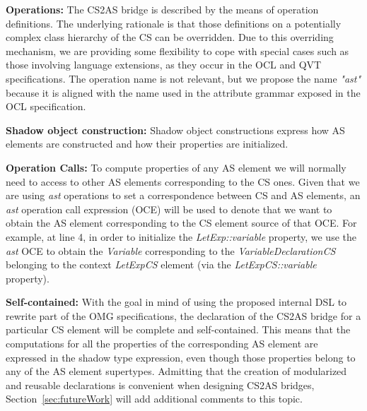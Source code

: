 \documentclass{llncs}
\begin{document}
\textbf{Operations:} The CS2AS bridge is described by the means of operation definitions. The underlying rationale is that those definitions on a potentially complex class hierarchy of the CS can be overridden. Due to this overriding mechanism, we are providing some flexibility to cope with special cases such as those involving language extensions, as they occur in the OCL and QVT specifications. The operation name is not relevant, but we propose the name \emph{"ast"} because it is aligned with the name used in the attribute grammar exposed in the OCL specification.

\textbf{Shadow object construction:} Shadow object constructions express how AS elements are constructed and how their properties are initialized. %

\textbf{Operation Calls:} To compute properties of any AS element we will normally need to access to other AS elements corresponding to the CS ones. Given that we are using \emph{ast} operations to set a correspondence between CS and AS elements, an \emph{ast} operation call expression (OCE) will be used to denote that we want to obtain the AS element corresponding to the CS element source of that OCE. For example, at line 4, in order to initialize the \emph{LetExp::variable} property, we use the \emph{ast} OCE to obtain the \emph{Variable} corresponding to the \emph{VariableDeclarationCS} belonging to the context \emph{LetExpCS} element (via the \emph{LetExpCS::variable} property).

\textbf{Self-contained:} With the goal in mind of using the proposed internal DSL to rewrite part of the OMG specifications, the declaration of the CS2AS bridge for a particular CS element will be complete and self-contained. This means that the computations for all the properties of the corresponding AS element are expressed in the shadow type expression, even though those properties belong to any of the AS element supertypes. Admitting that the creation of modularized and reusable declarations is convenient when designing CS2AS bridges, Section~\ref{sec:futureWork} will add additional comments to this topic.
\end{document}
